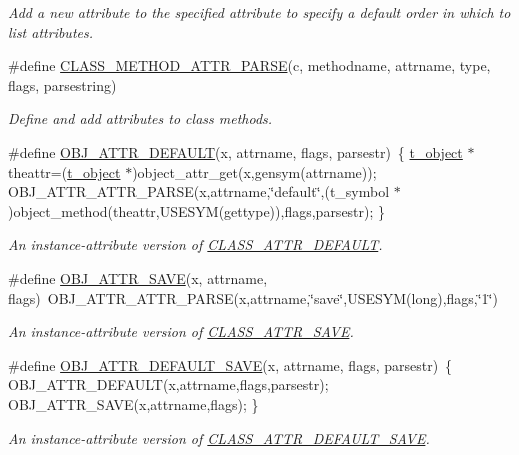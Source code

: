 \begin{DoxyCompactItemize}
\begin{DoxyCompactList}\small\item\em Add a new attribute to the specified attribute to specify a default order in which to list attributes. \item\end{DoxyCompactList}\item 
\#define \hyperlink{group__attr_ga389ea581eb9aece1a2c159bf1480a138}{CLASS\_\-METHOD\_\-ATTR\_\-PARSE}(c, methodname, attrname, type, flags, parsestring)
\begin{DoxyCompactList}\small\item\em Define and add attributes to class methods. \item\end{DoxyCompactList}\item 
\#define \hyperlink{group__attr_ga00b1f956b36c49d4e2a286ec9aaec754}{OBJ\_\-ATTR\_\-DEFAULT}(x, attrname, flags, parsestr)~\{ \hyperlink{structt__object}{t\_\-object} $\ast$theattr=(\hyperlink{structt__object}{t\_\-object} $\ast$)object\_\-attr\_\-get(x,gensym(attrname)); OBJ\_\-ATTR\_\-ATTR\_\-PARSE(x,attrname,\char`\"{}default\char`\"{},(t\_\-symbol $\ast$)object\_\-method(theattr,USESYM(gettype)),flags,parsestr); \}
\begin{DoxyCompactList}\small\item\em An instance-\/attribute version of \hyperlink{group__attr_ga91196b43f49d6769e6fe2df99f5c7c77}{CLASS\_\-ATTR\_\-DEFAULT}. \item\end{DoxyCompactList}\item 
\#define \hyperlink{group__attr_ga7488ec772db17fb474a096890b6d14da}{OBJ\_\-ATTR\_\-SAVE}(x, attrname, flags)~OBJ\_\-ATTR\_\-ATTR\_\-PARSE(x,attrname,\char`\"{}save\char`\"{},USESYM(long),flags,\char`\"{}1\char`\"{})
\begin{DoxyCompactList}\small\item\em An instance-\/attribute version of \hyperlink{group__attr_gaf56dc31d0defad3cdc1ee60b611acc79}{CLASS\_\-ATTR\_\-SAVE}. \item\end{DoxyCompactList}\item 
\#define \hyperlink{group__attr_ga62154786f87f40e1a6ce71f407c31b6c}{OBJ\_\-ATTR\_\-DEFAULT\_\-SAVE}(x, attrname, flags, parsestr)~\{ OBJ\_\-ATTR\_\-DEFAULT(x,attrname,flags,parsestr); OBJ\_\-ATTR\_\-SAVE(x,attrname,flags); \}
\begin{DoxyCompactList}\small\item\em An instance-\/attribute version of \hyperlink{group__attr_gae34187cee29d0508d00c725ba33c091a}{CLASS\_\-ATTR\_\-DEFAULT\_\-SAVE}. \item\end{DoxyCompactList}\item 

\end{DoxyCompactItemize}
